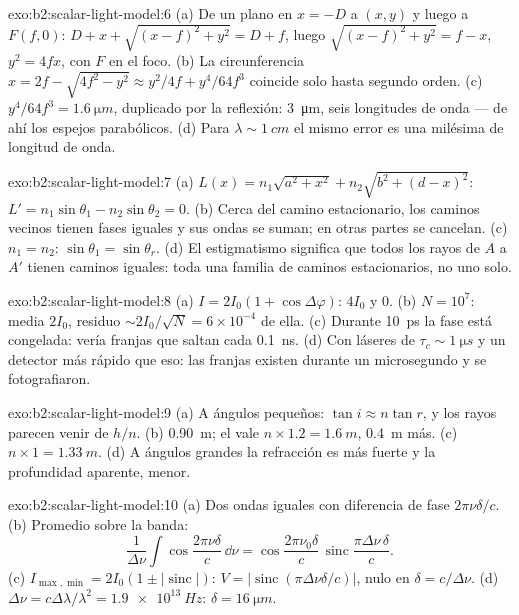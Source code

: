 \begin{solution}{exo:b2:scalar-light-model:6}
(a) De un  plano en $x = -D$ a $(x, y)$ y luego a $F(f, 0)$: $D + x
+ \sqrt{(x - f)^2 + y^2} = D + f$, luego $\sqrt{(x - f)^2 + y^2} = f - x$, $y^2 = 4fx$,
con $F$ en el foco. (b) La circunferencia $x = 2f - \sqrt{4f^2 - y^2} \approx y^2/4f +
y^4/64f^3$ coincide solo hasta segundo orden. (c) $y^4/64f^3 = \qty{1.6}{\micro m}$, duplicado
por la reflexión: \qty{3}{\micro m}, seis longitudes de onda --- de ahí los espejos
parabólicos. (d) Para $\lambda \sim \qty{1}{cm}$ el mismo error es una milésima de
longitud de onda.
\end{solution}

\begin{solution}{exo:b2:scalar-light-model:7}
(a) $L(x) = n_1\sqrt{a^2 + x^2} + n_2\sqrt{b^2 + (d - x)^2}$: $L' = n_1\sin\theta_1 -
n_2\sin\theta_2 = 0$. (b) Cerca del camino estacionario, los caminos vecinos tienen
fases iguales y sus ondas se suman; en otras partes se cancelan. (c) $n_1 = n_2$:
$\sin\theta_1 = \sin\theta_r$. (d) El estigmatismo significa que todos los rayos de $A$ a $A'$ tienen
caminos iguales: toda una familia de caminos estacionarios, no uno solo.
\end{solution}

\begin{solution}{exo:b2:scalar-light-model:8}
(a) $I = 2I_0(1 + \cos\Delta\varphi)$: $4I_0$ y $0$. (b) $N = 10^7$: media $2I_0$, residuo
$\sim 2I_0/\sqrt N = 6 \times 10^{-4}$ de ella. (c) Durante \qty{10}{ps} la fase está
congelada: vería franjas que saltan cada \qty{0.1}{ns}. (d) Con láseres de
$\tau_c \sim \qty{1}{\micro s}$ y un detector más rápido que eso: las franjas existen
durante un microsegundo y se fotografiaron.
\end{solution}

\begin{solution}{exo:b2:scalar-light-model:9}
(a) A ángulos pequeños: $\tan i \approx n\tan r$, y los rayos parecen venir de $h/n$.
(b) \qty{0.90}{m}; el  vale $n \times 1.2 = \qty{1.6}{m}$, \qty{0.4}{m} más.
(c) $n \times 1 = \qty{1.33}{m}$. (d) A ángulos grandes la refracción es más fuerte
y la profundidad aparente, menor.
\end{solution}

\begin{solution}{exo:b2:scalar-light-model:10}
(a) Dos ondas iguales con diferencia de fase $2\pi\nu\delta/c$. (b) Promedio
sobre la banda:
\[
\frac1{\Delta\nu}\int\cos\frac{2\pi\nu\delta}c\,\dd\nu = \cos\frac{2\pi\nu_0\delta}c\,\operatorname{sinc}\frac{\pi\Delta\nu\,\delta}c .
\]
(c)
$I_{\max, \min} = 2I_0(1 \pm |\operatorname{sinc}|)$: $V = |\operatorname{sinc}(\pi\Delta\nu\delta/c)|$,
nulo en $\delta = c/\Delta\nu$. (d) $\Delta\nu = c\Delta\lambda/\lambda^2 = \qty{1.9e13}{Hz}$: $\delta =
\qty{16}{\micro m}$.
\end{solution}

